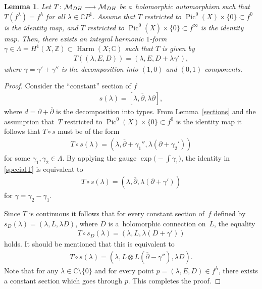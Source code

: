 \documentclass[11pt]{article}
\numberwithin{equation}{section}
\newtheorem{Lemma}[Theorem]{Lemma}
\begin{document}
\begin{Lemma}\label{almost-id} Let $T \colon {\mathcal M}_{\rm DH} \longrightarrow {\mathcal M}_{\rm DH}$ be a~holomorphic automorphism such that
$T(f^\lambda) = f^\lambda$ for all $\lambda \in \mathbb CP^1$. Assume that $T$ restricted to $\operatorname{Pic}^0(X)\times\{0\} \subset f^0$ is the
identity map, and $T$ restricted to $\operatorname{Pic}^0(\overline{X})\times\{0\} \subset f^\infty$ is the identity map. Then, there exists an integral harmonic $1$-form $\gamma \in \Lambda = H^1(X, \mathbb Z) \subset \operatorname{Harm}(X; \mathbb C)$ such that $T$ is given by
\begin{gather*}T((\lambda, E, D)) = (\lambda, E, D+\lambda\gamma') ,\end{gather*}
where $\gamma = \gamma'+\gamma''$ is the decomposition into $(1,0)$ and $(0,1)$ components.
\end{Lemma}

\begin{proof}
Consider the ``constant'' section of $f$
\begin{gather*}s(\lambda) = [\lambda, \overline{\partial}, \lambda \partial],\end{gather*}
where $d = \partial+\overline{\partial}$ is the decomposition into types. From Lemma~\ref{sections} and the assumption that~$T$ restricted to $\operatorname{Pic}^0(X)\times\{0\} \subset f^0$ is the identity map it follows that $T\circ s$ must be of the form
\begin{gather}\label{specialT}
T\circ s(\lambda) = (\lambda, \overline{\partial}+\gamma_1'', \lambda (\partial+\gamma_2'))
\end{gather}
for some $\gamma_1, \gamma_2 \in \Lambda$. By applying the gauge $\exp\big({-}\int\gamma_1\big)$, the identity in \eqref{specialT} is equivalent to
\begin{gather*}T\circ s(\lambda) = (\lambda, \overline{\partial}, \lambda (\partial+\gamma'))\end{gather*}
 for $\gamma = \gamma_2-\gamma_1$.

Since $T$ is continuous it follows that for every constant section of~$f$ def\/ined by $s_D(\lambda) = (\lambda, L, \lambda D)$, where $D$ is a~holomorphic connection on~$L$, the equality
\begin{gather*}T\circ s_D(\lambda) = (\lambda, L, \lambda (D+\gamma'))\end{gather*}
holds. It should be mentioned that this is equivalent to
\begin{gather*}T\circ s(\lambda) = (\lambda, L\otimes L(\overline{\partial}-\gamma''), \lambda D) .\end{gather*}
Note that for any $\lambda \in {\mathbb C}\setminus\{0\}$ and for every point $p = (\lambda, E, D) \in f^\lambda$, there exists a constant section
which goes through $p$. This completes the proof.
\end{proof}
\end{document}
